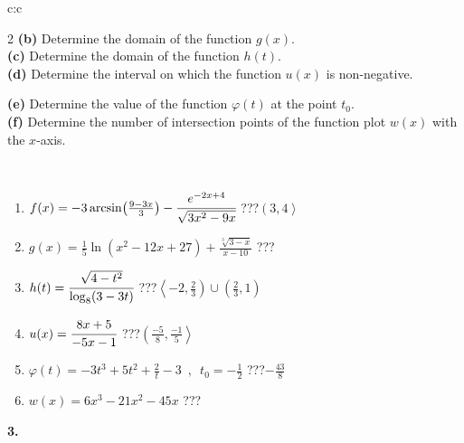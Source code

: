\documentclass[10pt]{report}
\begin{document}
\begin{tabular}{c:c}
\begin{minipage}[c][104.5mm][t]{0.5\linewidth}
\begin{center}
\begin{minipage}{0.95\linewidth}
\begin{center}
{\begin{multicols}{2}
\textbf{(b)} Determine the domain of the function \(g(x)\). \\[1mm]
\textbf{(c)} Determine the domain of the function \(h(t)\). \\[1mm]
\textbf{(d)} Determine the interval on which the function \(u(x)\) is non-negative. \par \columnbreak
\textbf{(e)} Determine the value of the function \(\varphi(t)\) at the point \(t_0\). \\[1mm]
\textbf{(f)} Determine the number of intersection points of the function plot \(w(x)\) with the \(x\)-axis. \\[1mm]
\end{multicols}
}
\end{center}
\end{minipage}
\\[4mm]
\begin{minipage}{0.79\linewidth}
\begin{center}
\begin{varwidth}{\linewidth}
\begin{enumerate}
\small
\item $f(x) = -3\arcsin\!\left( \frac{9-3x}{3} \right) - \cfrac{e^{-2x+4}}{\sqrt{3x^2-9x}}$\quad \dotfill\; ???\;\dotfill \quad $\left(3 , 4\right\rangle$
\item $g(x) = \frac{1}{5} \ln{\!(x^2-12x+27)}+\frac{\sqrt[3]{3-x}}{x-10}$\quad \dotfill\; ???\;\dotfill {}
\item $h(t) = \cfrac{\sqrt{4-t^2}}{\log_8(3-3t)}$\quad \dotfill\; ???\;\dotfill \quad $\left\langle-2 , \frac{2}{3}\right)\cup\left(\frac{2}{3} , 1\right)$
\item $u(x) = \cfrac{8x+5}{-5x-1}$\quad \dotfill\; ???\;\dotfill \quad $\left(\frac{-5}{8} , \frac{-1}{5}\right\rangle$
\item $\varphi(t) = -3t^3+5t^2+\frac{2}{t}-3 \enspace , \enspace t_0=-\frac{1}{2}$\quad \dotfill\; ???\;\dotfill \quad $-\frac{43}{8}$
\item $w(x) = 6x^3-21x^2-45x$\quad \dotfill\; ???\;\dotfill {}
\end{enumerate}
\end{varwidth}
\end{center}
\end{minipage}
\begin{minipage}{0.20\linewidth}
\begin{center}
{\Huge\bfseries 3.} \\[2mm]

\end{center}
\end{minipage}
\end{center}
\end{minipage}
\end{tabular}
\end{document}
